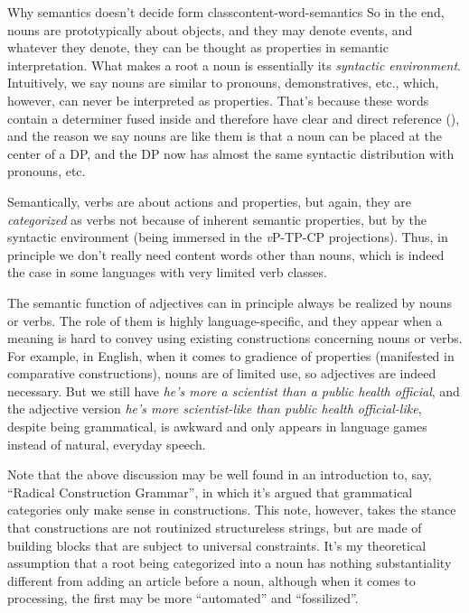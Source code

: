 \documentclass[UTF8, a4paper, oneside, scheme=plain]{ctexrep}
\newcommand{\corpus}[1]{\emph{#1}}
\newcommand{\vP}{\textit{v}P}
\begin{document}
\begin{theorybox}{Why semantics doesn't decide form class}{content-word-semantics}
    So in the end,
    nouns are prototypically about objects,
    and they may denote events, 
    and whatever they denote, they can be thought as properties in semantic interpretation.
    What makes a root a noun 
    is essentially its \emph{syntactic environment}.
    Intuitively, we say nouns are similar to pronouns, demonstratives, etc., 
    which, however, can never be interpreted as properties.
    That's because these words contain a determiner fused inside 
    and therefore have clear and direct reference (),
    and the reason we say nouns are like them 
    is that a noun can be placed at the center of a DP, 
    and the DP now has almost the same syntactic distribution with pronouns, etc. 

    Semantically, verbs are about actions and properties,
    but again, they are \emph{categorized} as verbs 
    not because of inherent semantic properties, 
    but by the syntactic environment
    (being immersed in the \vP-TP-CP projections).
    Thus, in principle we don't really need content words other than nouns,
    which is indeed the case in some languages
    with very limited verb classes.

    The semantic function of adjectives can in principle always be realized by nouns or verbs.
    The role of them is highly language-specific,
    and they appear when a meaning is hard to convey using existing constructions concerning nouns or verbs.
    For example, in English, when it comes to gradience of properties
    (manifested in comparative constructions),
    nouns are of limited use,
    so adjectives are indeed necessary.
    But we still have \corpus{he's more a scientist than a public health official},
    and the adjective version \corpus{he's more scientist-like than public health official-like},
    despite being grammatical, is awkward
    and only appears in language games instead of natural, everyday speech.

    Note that the above discussion may be well found in an introduction to, say, 
    ``Radical Construction Grammar'',
    in which it's argued that grammatical categories only make sense 
    in constructions.
    This note, however, takes the stance that 
    constructions are not routinized structureless strings,
    but are made of building blocks that are subject to universal constraints.
    It's my theoretical assumption that a root being categorized into a noun 
    has nothing substantiality different from adding an article before a noun,
    although when it comes to processing,
    the first may be more ``automated'' and ``fossilized''.
\end{theorybox}
\end{document}
